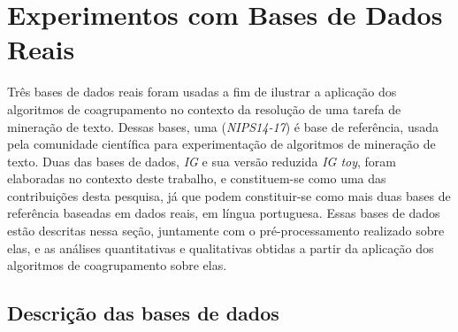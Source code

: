 \documentclass[
    12pt,                %
    oneside,            %
    a4paper,            %
    english,            %
    brazil                %
    ]{abntex2ppgsi}
\begin{document}






\section{Experimentos com Bases de Dados Reais}

Três bases de dados reais foram usadas a fim de ilustrar a aplicação dos algoritmos de coagrupamento no contexto da resolução de uma tarefa de mineração de texto.
Dessas bases, uma (\textit{NIPS14-17}) é base de referência, usada pela comunidade científica para experimentação de algoritmos de mineração de texto.
Duas das bases de dados, \textit{IG} e sua versão reduzida \textit{IG toy}, foram elaboradas no contexto deste trabalho, e constituem-se como uma das contribuições desta pesquisa, já que podem constituir-se como mais duas bases de referência baseadas em dados reais, em língua portuguesa.
Essas bases de dados estão descritas nessa seção, juntamente com o pré-processamento realizado sobre elas, e as análises quantitativas e qualitativas obtidas a partir da aplicação dos algoritmos de coagrupamento sobre elas.

\subsection{Descrição das bases de dados}
\end{document}
